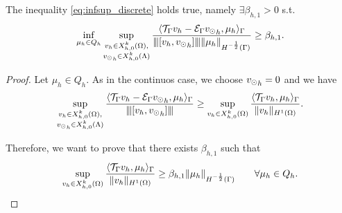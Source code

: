 \begin{theorem} The inequality \eqref{eq:infsup_discrete} holds true, namely 
$\exists \beta_{h,1} >0$ s.t.
\begin{equation}\label{inf_sup_discrete_prob1}
\inf_{\mu_h \in Q_h} 
\sup_{\substack{v_h \in X_{h,0}^k(\Omega),\\ {\vd}_h \in X_{h,0}^k(\Lambda)}} \frac{ \langle \trace v_h - \ext {\vd}_h, \mu_h \rangle _{\Gamma}} {\vertiii{[v_h, {\vd} _h]} \|\mu_h\|_{H^{-\frac 12 }(\Gamma)}} 
\geq \beta_{h,1}. 
\end{equation}
\end{theorem}

\begin{proof}
Let $\mu_h \in Q_h$. As in the continuos case, we choose ${v_{\odot}}_h =0$ and we have
\begin{equation*}
\sup_{\substack{v_h \in X_{h,0}^k(\Omega),\\ {v_{\odot}}_h \in X_{h,0}^k(\Lambda)}} \frac{ \langle {\mathcal{T}_\Gamma} v_h - \mathcal{E}_\Gamma {v_{\odot}}_h, \mu_h \rangle _{\Gamma}} {{\left\vert\kern-0.25ex\left\vert\kern-0.25ex\left\vert [v_h,  {v_{\odot}}_h] \right\vert\kern-0.25ex\right\vert\kern-0.25ex\right\vert}}
\geq \sup_{v_h \in X_{h,0}^k(\Omega)} \frac{ \langle {\mathcal{T}_\Gamma} v_h, \mu_h \rangle _{\Gamma} } {\|v_h\|_{H^1(\Omega)}}.
\end{equation*}

Therefore, we want to prove that there exists $\beta_{h,1}$ such that
\begin{equation*}
\sup_{v_h \in X_{h,0}^k(\Omega)} \frac{ \langle {\mathcal{T}_\Gamma} v_h, \mu_h \rangle _{\Gamma} } {\|v_h\|_{H^1(\Omega)}} \geq \beta_{h,1} \|\mu_h\|_{H^{-\frac 12}(\Gamma)} \qquad \forall \mu_h \in Q_h.
\end{equation*}


\end{proof}
